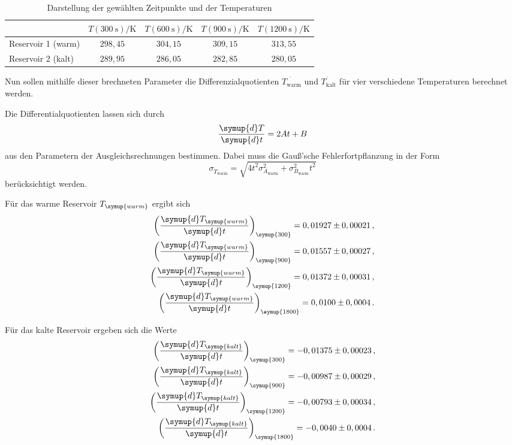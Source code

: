 \begin{table}[h]
		\centering
		\begin{tabular}{lcccc}
			\toprule
			& $T(\SI{300}{\second}) / \text{K}$ & $T(\SI{600}{\second}) / \text{K}$ & $T(\SI{900}{\second}) / \text{K}$ & $T(\SI{1200}{\second}) / \text{K}$\\
			\midrule
			Reservoir 1 (warm) & $298,45$ & $304,15$ & $309,15$ & $313,55$ \\
			Reservoir 2 (kalt) & $289,95$ & $286,05$ & $282,85$ & $280,05$ \\
			\bottomrule
		\end{tabular}
		\caption{Darstellung der gewählten Zeitpunkte und der Temperaturen}
		\label{fig:ausgewaehltemesswerte}
	\end{table}

Nun sollen mithilfe dieser brechneten Parameter die Differenzialquotienten
$\dot{T_\text{warm}}$ und $\dot{T_\text{kalt}}$ für vier verschiedene Temperaturen berechnet werden.

Die Differentialquotienten lassen sich durch
\begin{equation}
  \frac{\symup{d}T}{\symup{d}t}=2At+B
\end{equation}
aus den Parametern der Ausgleichsrechnungen bestimmen. Dabei muss die Gauß'sche
Fehlerfortpflanzung in der Form
\begin{equation}
  \sigma_{\dot{T}_\text{warm}} = \sqrt{4 t^2 \sigma_{A_\text{warm}}^{2} + \sigma_{B_\text{warm}}^{2} t^{2}}
\end{equation}
berücksichtigt werden.

Für das warme Reservoir $T_{\symup{warm}}$ ergibt sich
\begin{align*}
  \biggl(\frac{\symup{d}T_{\symup{warm}}}{\symup{d}t}\biggr)_{\symup{300}} = 0,01927\pm0,00021 \,,\\
  \biggl(\frac{\symup{d}T_{\symup{warm}}}{\symup{d}t}\biggr)_{\symup{900}} =  0,01557\pm0,00027\,,\\
  \biggl(\frac{\symup{d}T_{\symup{warm}}}{\symup{d}t}\biggr)_{\symup{1200}} = 0,01372\pm0,00031\,,\\
  \biggl(\frac{\symup{d}T_{\symup{warm}}}{\symup{d}t}\biggr)_{\symup{1800}} = 0,0100\pm0,0004\,.\\
\end{align*}


Für das kalte Reservoir ergeben sich die Werte
\begin{align*}
  \biggl(\frac{\symup{d}T_{\symup{kalt}}}{\symup{d}t}\biggr)_{\symup{300}} = -0,01375\pm0,00023 \,,\\
  \biggl(\frac{\symup{d}T_{\symup{kalt}}}{\symup{d}t}\biggr)_{\symup{900}} =  -0,00987\pm0,00029\,,\\
  \biggl(\frac{\symup{d}T_{\symup{kalt}}}{\symup{d}t}\biggr)_{\symup{1200}} = -0,00793\pm0,00034\,,\\
  \biggl(\frac{\symup{d}T_{\symup{kalt}}}{\symup{d}t}\biggr)_{\symup{1800}} = -0,0040\pm0,0004\,.\\
\end{align*}

